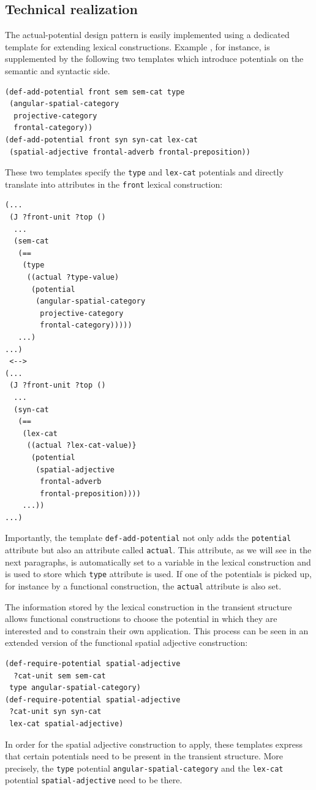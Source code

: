 \subsection{Technical realization}
The actual-potential design pattern is easily implemented
using a dedicated template for extending lexical constructions.
Example , for instance, is supplemented by the following two 
templates which introduce potentials on the semantic and syntactic side.
\ea
\label{e:def-lex-front-potentials}
\begin{lstlisting}
(def-add-potential front sem sem-cat type 
 (angular-spatial-category 
  projective-category 
  frontal-category))
(def-add-potential front syn syn-cat lex-cat 
 (spatial-adjective frontal-adverb frontal-preposition))
\end{lstlisting}
\z
These two templates specify the {\footnotesize\tt type} and 
{\footnotesize\tt lex-cat} potentials and directly translate into 
attributes in the {\footnotesize\tt front} lexical construction:
\ea
\label{e:def-lex-front-cxn}
\begin{lstlisting}
(...
 (J ?front-unit ?top ()
  ...
  (sem-cat 
   (== 
    (type 
     ((actual ?type-value)
      (potential 
       (angular-spatial-category 
        projective-category 
        frontal-category)))))
   ...)
...)
 <-->
(...
 (J ?front-unit ?top ()
  ...
  (syn-cat 
   (== 
    (lex-cat
     ((actual ?lex-cat-value)}
      (potential 
       (spatial-adjective 
        frontal-adverb 
        frontal-preposition))))
    ...))
...)
\end{lstlisting}
\z
Importantly, the template {\footnotesize\tt def-add-potential} 
not only adds the {\footnotesize\tt potential} attribute but also an 
attribute called {\footnotesize\tt actual}. This attribute, as we will
see in the next paragraphs, is automatically set to a variable 
in the lexical construction and is used to store which 
{\footnotesize\tt type} attribute is used. If one of the potentials 
is picked up, for instance by a functional construction, the 
{\footnotesize\tt actual} attribute is also set.

The information stored by the lexical construction in the transient structure
allows functional constructions to choose 
the potential in which they are interested and to constrain
their own application. This process can be seen in an extended 
version of the functional spatial adjective construction:
\ea
\label{e:def-fun-spatial-adjective-potentials}
\begin{lstlisting}
(def-require-potential spatial-adjective 
  ?cat-unit sem sem-cat 
 type angular-spatial-category)
(def-require-potential spatial-adjective 
 ?cat-unit syn syn-cat
 lex-cat spatial-adjective)
\end{lstlisting}
\z
In order for the spatial adjective 
construction to apply, these templates express that certain potentials need to be present in the 
transient structure. More precisely, the {\footnotesize\tt type} potential 
{\footnotesize\tt angular-spatial-category} and the {\footnotesize\tt lex-cat} potential 
{\footnotesize\tt spatial-adjective} need to be there. 

